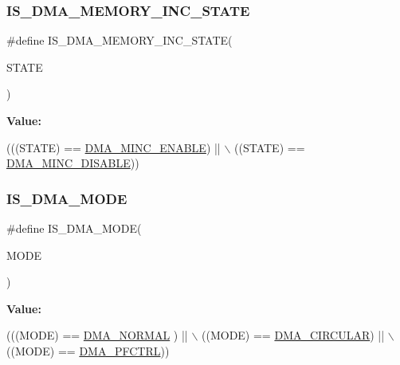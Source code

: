 \subsubsection{\texorpdfstring{I\+S\+\_\+\+D\+M\+A\+\_\+\+M\+E\+M\+O\+R\+Y\+\_\+\+I\+N\+C\+\_\+\+S\+T\+A\+TE}{IS\_DMA\_MEMORY\_INC\_STATE}}
{\footnotesize\ttfamily \#define I\+S\+\_\+\+D\+M\+A\+\_\+\+M\+E\+M\+O\+R\+Y\+\_\+\+I\+N\+C\+\_\+\+S\+T\+A\+TE(\begin{DoxyParamCaption}\item[{}]{S\+T\+A\+TE }\end{DoxyParamCaption})}

{\bfseries Value\+:}
\begin{DoxyCode}
(((STATE) == \mbox{\hyperlink{group___d_m_a___memory__incremented__mode_ga43d30885699cc8378562316ff4fed1cd}{DMA\_MINC\_ENABLE}})  || \(\backslash\)
                                        ((STATE) == \mbox{\hyperlink{group___d_m_a___memory__incremented__mode_ga32625330516c188151743473fad97a33}{DMA\_MINC\_DISABLE}}))
\end{DoxyCode}
\mbox{\label{group___d_m_a___private___macros_gad88ee5030574d6a573904378fb62c7ac}} 
\subsubsection{\texorpdfstring{I\+S\+\_\+\+D\+M\+A\+\_\+\+M\+O\+DE}{IS\_DMA\_MODE}}
{\footnotesize\ttfamily \#define I\+S\+\_\+\+D\+M\+A\+\_\+\+M\+O\+DE(\begin{DoxyParamCaption}\item[{}]{M\+O\+DE }\end{DoxyParamCaption})}

{\bfseries Value\+:}
\begin{DoxyCode}
(((MODE) == \mbox{\hyperlink{group___d_m_a__mode_ga04941acfbbdefc53e1e08133cffa3b8a}{DMA\_NORMAL}} )  || \(\backslash\)
                           ((MODE) == \mbox{\hyperlink{group___d_m_a__mode_ga4c4f425cba13edffb3c831c036c91e01}{DMA\_CIRCULAR}}) || \(\backslash\)
                           ((MODE) == \mbox{\hyperlink{group___d_m_a__mode_ga7974ee645c8e275a2297cf37eec9e022}{DMA\_PFCTRL}}))
\end{DoxyCode}
\mbox{\label{group___d_m_a___private___macros_ga7c60961178e2a32e9e364a220a8aca88}} 

